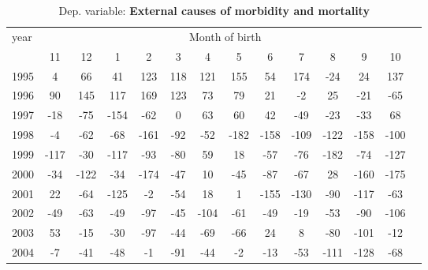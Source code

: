  \begin{table}[H] \begin{threeparttable} \centering \caption{Dep. variable: \textbf{External causes of morbidity and mortality}} {\def\sym#1{\ifmmode^{#1}\else\(^{#1}\)\fi} \begin{tabular}{l*{13}{c}} \toprule year & \multicolumn{12}{c}{Month of birth} \\ \cmidrule(lr){2-13} 
            &          11&          12&           1&           2&           3&           4&           5&           6&           7&           8&           9&          10\\
1995        &           4&          66&          41&         123&         118&         121&         155&          54&         174&         -24&          24&         137\\
1996        &          90&         145&         117&         169&         123&          73&          79&          21&          -2&          25&         -21&         -65\\
1997        &         -18&         -75&        -154&         -62&           0&          63&          60&          42&         -49&         -23&         -33&          68\\
1998        &          -4&         -62&         -68&        -161&         -92&         -52&        -182&        -158&        -109&        -122&        -158&        -100\\
1999        &        -117&         -30&        -117&         -93&         -80&          59&          18&         -57&         -76&        -182&         -74&        -127\\
2000        &         -34&        -122&         -34&        -174&         -47&          10&         -45&         -87&         -67&          28&        -160&        -175\\
2001        &          22&         -64&        -125&          -2&         -54&          18&           1&        -155&        -130&         -90&        -117&         -63\\
2002        &         -49&         -63&         -49&         -97&         -45&        -104&         -61&         -49&         -19&         -53&         -90&        -106\\
2003        &          53&         -15&         -30&         -97&         -44&         -69&         -66&          24&           8&         -80&        -101&         -12\\
2004        &          -7&         -41&         -48&          -1&         -91&         -44&          -2&         -13&         -53&        -111&        -128&         -68\\

\end{tabular}}
\end{threeparttable}
\end{table}

